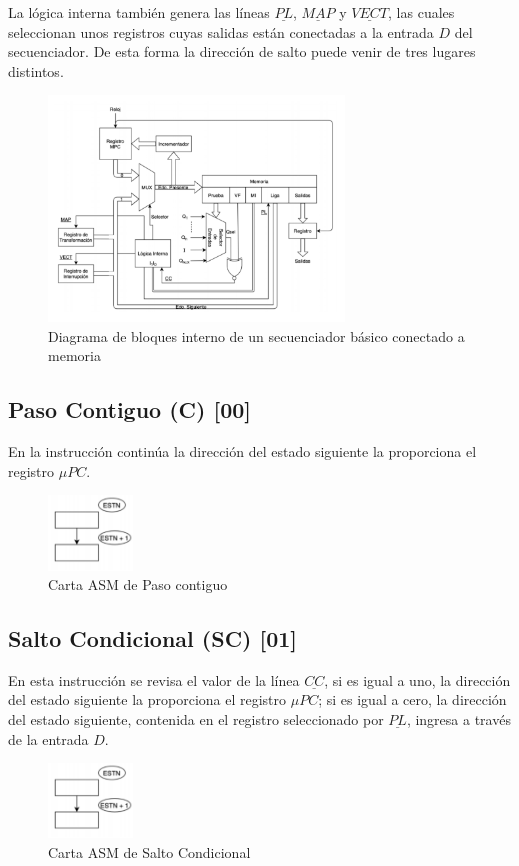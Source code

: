 \documentclass[table]{scrartcl}
\begin{document}
La lógica interna también genera las líneas $\underline{PL}$, $\underline{MAP}$
y $\underline{VECT}$, las cuales seleccionan unos registros cuyas salidas están
conectadas a la entrada $D$ del secuenciador. De esta forma la dirección de salto
puede venir de tres lugares distintos.
\begin{figure}[H]
  \centering
  \includegraphics[width=0.7\textwidth]{./img/dia_fin_ex}
  \caption{Diagrama de bloques interno de un secuenciador básico conectado a memoria}\label{fig:dia_fin_ex}
\end{figure}

\subsection{Paso Contiguo (C) [00]}\label{sec:paso-contiguo-c}
En la instrucción continúa la dirección del estado siguiente la proporciona el
registro $\mu{}PC$.
\begin{figure}[H]
  \centering
  \includegraphics[width=0.2\textwidth]{./img/pc}
  \caption{Carta ASM de Paso contiguo}\label{fig:pc}
\end{figure}

\subsection{Salto Condicional (SC) [01]}\label{sec:salto-cond-sc}
En esta instrucción se revisa el valor de la línea $\underline{CC}$, si es igual a uno, la dirección del estado
siguiente la proporciona el registro $\mu{}PC$; si es igual a cero, la dirección del estado siguiente,
contenida en el registro seleccionado por $\underline{PL}$, ingresa a través de la entrada $D$.
\begin{figure}[H]
  \centering
  \includegraphics[width=0.2\textwidth]{./img/pc}
  \caption{Carta ASM de Salto Condicional}\label{fig:sc}
\end{figure}
\end{document}
